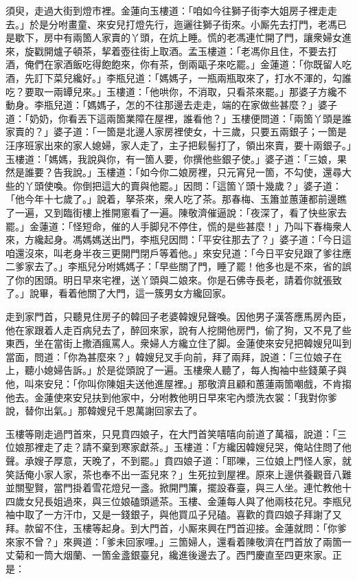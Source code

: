 須臾，走過大街到燈市裡。金蓮向玉樓道：「咱如今往獅子街李大姐房子裡走走去。」於是分咐畫童、來安兒打燈先行，迤邐往獅子街來。小厮先去打門，老馮已是歇下，房中有兩箇人家賣的丫頭，在炕上睡。慌的老馮連忙開了門，讓衆婦女進來，旋戳開爐子頓茶，挈着壺往街上取酒。孟玉樓道：「老馮你且住，不要去打酒，俺們在家酒飯吃得飽飽來，你有茶，倒兩甌子來吃罷。」金蓮道：「你既留人吃酒，先訂下菜兒纔好。」李瓶兒道：「媽媽子，一瓶兩瓶取來了，打水不渾的，勾誰吃？要取一兩罈兒來。」{}玉樓道：「他哄你，不消取，只看茶來罷。」那婆子方纔不動身。李瓶兒道：「媽媽子，怎的不往那邊去走走，端的在家做些甚麼？」婆子道：「奶奶，你看丟下這兩箇業障在屋裡，誰看他？」玉樓便問道：「兩箇丫頭是誰家賣的？」婆子道：「一箇是北邊人家房裡使女，十三歲，只要五兩銀子；一箇是汪序班家出來的家人媳婦，家人走了，主子把鬏髻打了，領出來賣，要十兩銀子。」玉樓道：「媽媽，我說與你，有一箇人要，你撰他些銀子使。」婆子道：「三娘，果然是誰要？告我說。」玉樓道：「如今你二娘房裡，只元宵兒一箇，不勾使，還尋大些的丫頭使喚。你倒把這大的賣與他罷。」因問：「這箇丫頭十幾歲？」婆子道：「他今年十七歲了。」說着，拏茶來，衆人吃了茶。那春梅、玉簫並蕙蓮都前邊瞧了一遍，又到臨街樓上推開窻看了一遍。陳敬濟催逼說：「夜深了，看了快些家去罷。」金蓮道：「怪短命，催的人手脚兒不停住，慌的是些甚麼！」乃叫下春梅衆人來，方纔起身。馮媽媽送出門，李瓶兒因問：「平安往那去了？」婆子道：「今日這咱還沒來，叫老身半夜三更開門閉戶等着他。」來安兒道：「今日平安兒跟了爹往應二爹家去了。」李瓶兒分咐媽媽子：「早些關了門，睡了罷！他多也是不來，省的誤了你的困頭。明日早來宅裡，送丫頭與二娘來。你是石佛寺長老，請着你就張致了。」說畢，看着他關了大門，這一簇男女方纔回家。

走到家門首，只聽見住房子的韓回子老婆韓嫂兒聲喚。{}因他男子漢答應馬房內臣，他在家跟着人走百病兒去了，醉回來家，說有人挖開他房門，偷了狗，又不見了些東西，坐在當街上撒酒瘋罵人。衆婦人方纔立住了脚。金蓮使來安兒把韓嫂兒叫到當面，問道：「你為甚麼來？」韓嫂兒叉手向前，拜了兩拜，說道：「三位娘子在上，聽小媳婦告訴。」於是從頭說了一遍。玉樓衆人聽了，每人掏袖中些錢菓子與他，叫來安兒：「你叫你陳姐夫送他進屋裡。」那敬濟且顧和蕙蓮兩箇嘲戲，不肯搊他去。金蓮使來安兒扶到他家中，分咐教他明日早來宅內漿洗衣裳：「我對你爹說，替你出氣。」那韓嫂兒千恩萬謝回家去了。

玉樓等剛走過門首來，只見賁四娘子，{}在大門首笑嘻嘻向前道了萬福，說道：「三位娘那裡走了走？請不棄到寒家獻茶。」玉樓道：「方纔因韓嫂兒哭，俺站住問了他聲。承嫂子厚意，天晚了，不到罷。」賁四娘子道：「耶嚛，三位娘上門怪人家，就笑話俺小家人家，茶也奉不出一盃兒來？」生死拉到屋裡。原來上邊供養觀音八難並關聖賢，當門掛着雪花燈兒一盞。掀開門簾，擺設春臺，與三人坐。連忙教他十四歲女兒長姐過來，與三位娘磕頭遞茶。玉樓、金蓮每人與了他兩枝花兒。李瓶兒袖中取了一方汗巾，又是一錢銀子，與他買瓜子兒磕。喜歡的賁四娘子拜謝了又拜。款留不住，玉樓等起身。到大門首，小厮來興在門首迎接。金蓮就問：「你爹來家不曾？」來興道：「爹未回家哩。」三箇婦人，還看着陳敬濟在門首放了兩箇一丈菊和一筒大烟蘭、一箇金盞銀臺兒，纔進後邊去了。{}西門慶直至四更來家。正是：

